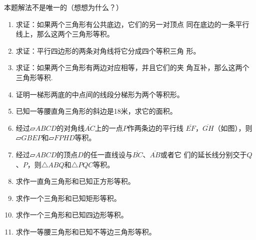 \begin{rmk}
    本题解法不是唯一的（想想为什么？）
\end{rmk}

\begin{Practice}
\begin{enumerate}
    \item 求证：如果两个三角形有公共底边，它们的另一对顶点
    同在底边的一条平行线上，那么这两个三角形等积。
    \item 求证：平行四边形的两条对角线将它分成四个等积三角
    形。
    \item 求证：如果两个三角形有两边对应相等，并且它们的夹
    角互补，那么这两个三角形等积.
    \item 证明一梯形两底的中点间的线段分梯形为两个等积形。
    \item 已知一等腰直角三角形的斜边是18米，求它的面积。
    \item 经过$\parallelogram ABCD$的对角线$\overline{AC}$上的一点$P$作两条边的平行线
    $\overline{EF}$，$\overline{GH}$（如图），则$\parallelogram GBEP$和$\parallelogram FPHD$等积。
    \item 经过$\parallelogram ABCD$的顶点$D$的任一直线设与$\overline{BC}$、$\overline{AB}$或者它
    们的延长线分别交于$Q$、$P$，则$\triangle ABQ$和$\triangle PQC$等积。
    \item 求作一直角三角形和已知正方形等积。
    \item 求作一个三角形和已知矩形等积。
    \item 求作一个三角形和已知四边形等积。
    \item 求作一等腰三角形和已知不等边三角形等积。
\end{enumerate}
\end{Practice}

